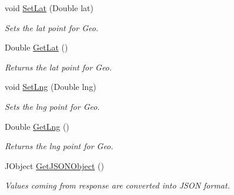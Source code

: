 \begin{DoxyCompactItemize}
\item 
void \hyperlink{classcom_1_1shephertz_1_1app42_1_1paas_1_1sdk_1_1windows_1_1storage_1_1_geo_tag_a9faa4357e96d29b788d55ab4b0fa6449}{Set\+Lat} (Double lat)
\begin{DoxyCompactList}\small\item\em Sets the lat point for Geo. \end{DoxyCompactList}\item 
Double \hyperlink{classcom_1_1shephertz_1_1app42_1_1paas_1_1sdk_1_1windows_1_1storage_1_1_geo_tag_a95da05809da5fa98edac85b7c7662b5a}{Get\+Lat} ()
\begin{DoxyCompactList}\small\item\em Returns the lat point for Geo. \end{DoxyCompactList}\item 
void \hyperlink{classcom_1_1shephertz_1_1app42_1_1paas_1_1sdk_1_1windows_1_1storage_1_1_geo_tag_a4afb8a37115f867643f6417a52666410}{Set\+Lng} (Double lng)
\begin{DoxyCompactList}\small\item\em Sets the lng point for Geo. \end{DoxyCompactList}\item 
Double \hyperlink{classcom_1_1shephertz_1_1app42_1_1paas_1_1sdk_1_1windows_1_1storage_1_1_geo_tag_a3e34bd5e3d59e7d18f776df74285c1ee}{Get\+Lng} ()
\begin{DoxyCompactList}\small\item\em Returns the lng point for Geo. \end{DoxyCompactList}\item 
J\+Object \hyperlink{classcom_1_1shephertz_1_1app42_1_1paas_1_1sdk_1_1windows_1_1storage_1_1_geo_tag_a22998563bf8591b42f99e4f300ffc46a}{Get\+J\+S\+O\+N\+Object} ()
\begin{DoxyCompactList}\small\item\em Values coming from response are converted into J\+S\+O\+N format. \end{DoxyCompactList}\end{DoxyCompactItemize}


